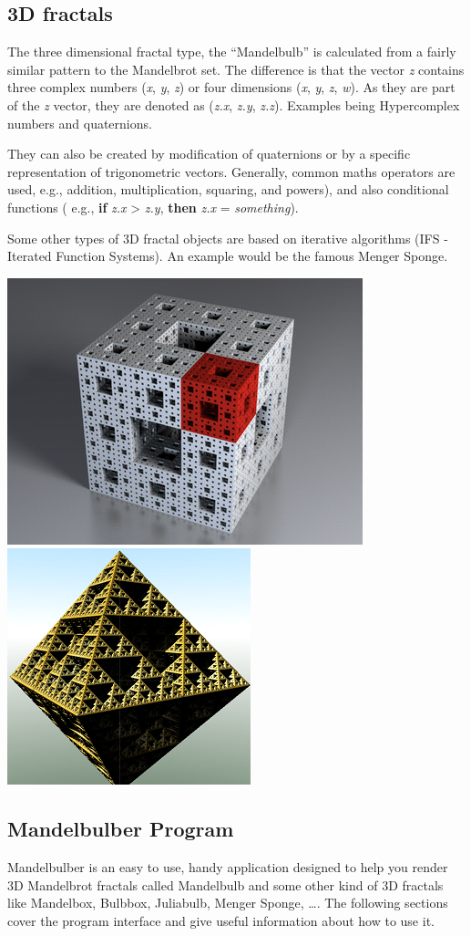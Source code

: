 \subsection{3D fractals}\label{d-fractals}

The three dimensional fractal type, the ``Mandelbulb'' is calculated from a
fairly similar pattern to the Mandelbrot set. The difference is that the vector
\emph{z} contains three complex numbers (\emph{x}, \emph{y}, \emph{z}) or four
dimensions (\emph{x}, \emph{y}, \emph{z}, \emph{w}). As they are part of the
\emph{z} vector, they are denoted as (\emph{z.x}, \emph{z.y}, \emph{z.z}).
Examples being Hypercomplex numbers and quaternions.

They can also be created by modification of quaternions or by a specific
representation of trigonometric vectors. Generally, common maths operators are
used, e.g., addition, multiplication, squaring, and powers), and also
conditional functions ( e.g., \textbf{if} \emph{z.x} \textgreater{} \emph{z.y},
\textbf{then} \emph{z.x} = \emph{something}).

Some other types of 3D fractal objects are based on iterative algorithms (IFS -
Iterated Function Systems). An example would be the famous Menger Sponge.
\nopagebreak

\includegraphics[height=0.4\linewidth]{img/manual/media/menger_sponge.png} \includegraphics[height=0.4\linewidth]{img/manual/media/sierpinski.png}

\subsection{Mandelbulber Program}\label{mandelbulber-program}

Mandelbulber is an easy to use, handy application designed to help you render 3D
Mandelbrot fractals called Mandelbulb and some other kind of 3D fractals like
Mandelbox, Bulbbox, Juliabulb, Menger Sponge, \ldots{}. The following sections
cover the program interface and give useful information about how to use it.
